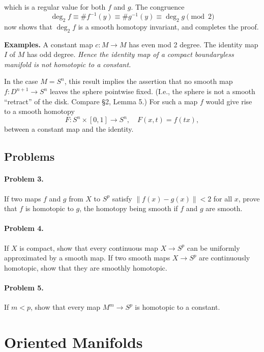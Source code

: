
which is a regular value for both $f$ and $g$. The congruence
\[
\deg_2 f \equiv \#f^{-1}(y) \equiv \#g^{-1}(y) \equiv \deg_2 g \pmod{2}
\]
now shows that $\deg_2 f$ is a smooth homotopy invariant, and completes the proof.

\noindent\textbf{Examples.} A constant map $c : M \to M$ has even mod 2 degree. The identity map $I$ of $M$ has odd degree. \textit{Hence the identity map of a compact boundaryless manifold is not homotopic to a constant.}

In the case $M = S^n$, this result implies the assertion that no smooth map $f : D^{n+1} \to S^n$ leaves the sphere pointwise fixed. (I.e., the sphere is not a smooth ``retract'' of the disk. Compare §2, Lemma 5.) For such a map $f$ would give rise to a smooth homotopy
\[
F : S^n \times [0, 1] \to S^n, \quad F(x, t) = f(tx),
\]
between a constant map and the identity.

\subsection*{Problems}

\paragraph{Problem 3.}
If two maps $f$ and $g$ from $X$ to $S^p$ satisfy $\|f(x) - g(x)\| < 2$ for all $x$, prove that $f$ is homotopic to $g$, the homotopy being smooth if $f$ and $g$ are smooth.

\paragraph{Problem 4.}
If $X$ is compact, show that every continuous map $X \to S^p$ can be uniformly approximated by a smooth map. If two smooth maps $X \to S^p$ are continuously homotopic, show that they are smoothly homotopic.

\paragraph{Problem 5.}
If $m < p$, show that every map $M^m \to S^p$ is homotopic to a constant.



\section{Oriented Manifolds}

